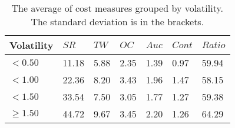 \begin{table}
\centering
\caption{The average of cost measures grouped by volatility. The standard deviation is in the brackets.
}
\label{tbl:cost_report}
\begin{tabular}{lllllll}
\toprule
 Volatility &  $SR$ & $TW$ & $OC$ & $Auc$ & $Cont$ & $Ratio$ \\
\midrule
    $<0.50$ & 11.18 & 5.88 & 2.35 &  1.39 &   0.97 &   59.94 \\
    $<1.00$ & 22.36 & 8.20 & 3.43 &  1.96 &   1.47 &   58.15 \\
    $<1.50$ & 33.54 & 7.50 & 3.05 &  1.77 &   1.27 &   59.38 \\
$\geq 1.50$ & 44.72 & 9.67 & 3.45 &  2.20 &   1.26 &   64.29 \\
\bottomrule
\end{tabular}
\end{table}

